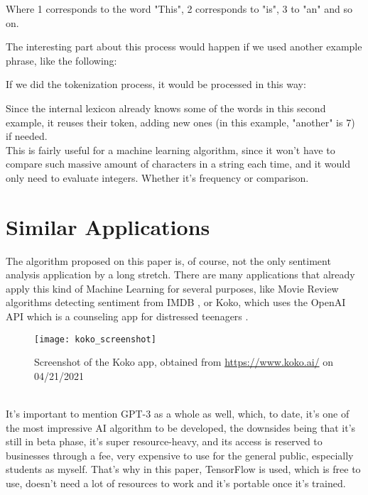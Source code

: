 Where 1 corresponds to the word "This", 2 corresponds to "is", 3 to "an" and so on.

The interesting part about this process would happen if we used another example phrase, like the following:
\begin{center}
\end{center}

If we did the tokenization process, it would be processed in this way:
\begin{center}
\end{center}

Since the internal lexicon already knows some of the words in this second example, it reuses their token, adding new ones (in this example, "another" is 7) if needed.\\

This is fairly useful for a machine learning algorithm, since it won't have to compare such massive amount of characters in a string each time, and it would only need to evaluate integers. Whether it's frequency or comparison.

\section{Similar Applications}
The algorithm proposed on this paper is, of course, not the only sentiment analysis application by a long stretch. There are many applications that already apply this kind of Machine Learning for several purposes, like Movie Review algorithms detecting sentiment from IMDB \citep{rf5}, or Koko, which uses the OpenAI API which is a counseling app for distressed teenagers \citep{rf6}.
\begin{figure}[h]
	\centering
	\texttt{[image: koko\_screenshot]}
	\caption{Screenshot of the Koko app, obtained from \url{https://www.koko.ai/} on 04/21/2021}
	\label{fig:koko}
\end{figure}
\\
It's important to mention GPT-3 as a whole as well, which, to date, it's one of the most impressive AI algorithm to be developed, the downsides being that it's still in beta phase, it's super resource-heavy, and its access is reserved to businesses through a fee, very expensive to use for the general public, especially students as myself. That's why in this paper, TensorFlow is used, which is free to use, doesn't need a lot of resources to work and it's portable once it's trained.

\clearpage